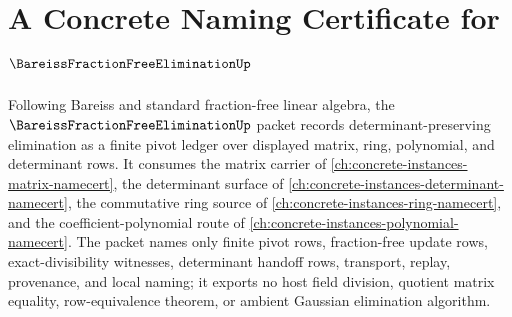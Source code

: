 \chapter{A Concrete Naming Certificate for $\BareissFractionFreeEliminationUp$}
\label{ch:concrete-instances-bareiss-fraction-free-elimination-namecert}

Following Bareiss and standard fraction-free linear algebra, the $\BareissFractionFreeEliminationUp$ packet records determinant-preserving elimination as a finite pivot ledger over displayed matrix, ring, polynomial, and determinant rows. It consumes the matrix carrier of \autoref{ch:concrete-instances-matrix-namecert}, the determinant surface of \autoref{ch:concrete-instances-determinant-namecert}, the commutative ring source of \autoref{ch:concrete-instances-ring-namecert}, and the coefficient-polynomial route of \autoref{ch:concrete-instances-polynomial-namecert}. The packet names only finite pivot rows, fraction-free update rows, exact-divisibility witnesses, determinant handoff rows, transport, replay, provenance, and local naming; it exports no host field division, quotient matrix equality, row-equivalence theorem, or ambient Gaussian elimination algorithm.

